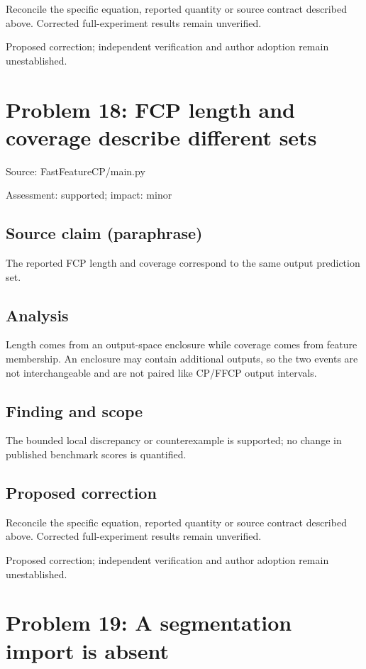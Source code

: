 \documentclass[11pt]{article}
\begin{document}
Reconcile the specific equation, reported quantity or source contract described above. Corrected full-experiment results remain unverified.

Proposed correction; independent verification and author adoption remain unestablished.

\section*{Problem 18: FCP length and coverage describe different sets}

Source: FastFeatureCP/main.py

Assessment: supported; impact: minor

\subsection*{Source claim (paraphrase)}

The reported FCP length and coverage correspond to the same output prediction set.

\subsection*{Analysis}

Length comes from an output-space enclosure while coverage comes from feature membership. An enclosure may contain additional outputs, so the two events are not interchangeable and are not paired like CP/FFCP output intervals.

\subsection*{Finding and scope}

The bounded local discrepancy or counterexample is supported; no change in published benchmark scores is quantified.

\subsection*{Proposed correction}

Reconcile the specific equation, reported quantity or source contract described above. Corrected full-experiment results remain unverified.

Proposed correction; independent verification and author adoption remain unestablished.

\section*{Problem 19: A segmentation import is absent}
\end{document}
